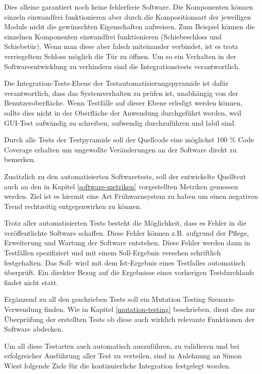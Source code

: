 Dies alleine garantiert noch keine fehlerfreie Software. Die Komponenten können einzeln einwandfrei funktionieren aber durch die Kompositionsart der jeweiligen Module nicht die gewünschten Eigenschaften aufweisen. Zum Beispiel können die einzelnen Komponenten einwandfrei funktionieren (Schiebeschloss und Schiebetür). Wenn man diese aber falsch miteinander verbindet, ist es trotz verriegeltem Schloss möglich die Tür zu öffnen. Um so ein Verhalten in der Softwareentwicklung zu verhindern sind die Integrationstests verantwortlich. 

Die Integration-Tests-Ebene der Testautomatisierungspyramide ist dafür verantwortlich, dass das
Systemverhalten zu prüfen ist, unabhängig von der Benutzeroberfläche. Wenn Testfälle auf dieser
Ebene erledigt werden können, sollte dies nicht in der Oberfläche der Anwendung durchgeführt
werden, weil GUI-Test aufwändig zu schreiben, aufwendig durchzuführen und labil sind. 

Durch alle Tests der Testpyramide soll der Quellcode eine möglichst 100 \% Code Coverage erhalten um ungewollte Veränderungen an der Software direkt zu bemerken. 

Zusätzlich zu den automatisierten Softwaretests, soll der entwickelte Quelltext auch an den in Kapitel \ref{software-metriken} vorgestellten Metriken gemessen werden. Ziel ist es hiermit eine Art Frühwarnsystem zu haben um einen negativen Trend rechtzeitig entgegenwirken zu können.

Trotz aller automatisierten Tests besteht die Möglichkeit, dass es Fehler in die veröffentlichte Software schaffen. Diese Fehler können z.B. aufgrund der Pflege, Erweiterung und Wartung der Software entstehen. Diese Fehler werden dann in Testfällen spezifiziert und mit einem Soll-Ergebnis versehen schriftlich festgehalten. Das Soll- wird mit dem Ist-Ergebnis eines Testfalles automatisch überprüft. Ein direkter Bezug auf die Ergebnisse eines vorherigen Testdurchlaufs findet nicht statt.

Ergänzend zu all den geschrieben Tests soll ein Mutation Testing Szenario Verwendung finden. Wie in Kapitel \ref{mutation-testing} beschrieben, dient dies zur Überprüfung der erstellten Tests ob diese auch wirklich relevante Funktionen der Software abdecken.

Um all diese Testarten auch automatisch auszuführen, zu validieren und bei erfolgreicher Ausführung aller Test zu verteilen, sind in Anlehnung an Simon Wiest folgende Ziele für die kontinuierliche Integration festgelegt worden.

